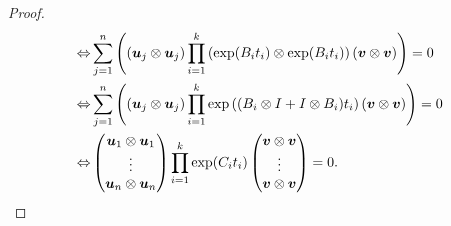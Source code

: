 \begin{proof}
\begin{align*}
\Leftrightarrow &\sum \limits_{j=1}^{n} \left( \left( \boldsymbol{u}_{j} \otimes \boldsymbol{u}_{j} \right) \prod \limits_{i=1}^{k} \left( \exp( B_{i} t_{i} ) \otimes \exp(B_{i} t_{i}) \right) \left( \boldsymbol{v} \otimes \boldsymbol{v} \right) \right) = 0 \\
\Leftrightarrow &\sum \limits_{j=1}^{n} \left( \left( \boldsymbol{u}_{j} \otimes \boldsymbol{u}_{j} \right) \prod \limits_{i=1}^{k} \exp\left((B_{i} \otimes I + I \otimes B_{i}) t_{i} \right) \left( \boldsymbol{v} \otimes \boldsymbol{v} \right) \right) = 0 \\
\Leftrightarrow &\begin{pmatrix} \boldsymbol{u}_{1} \otimes \boldsymbol{u}_{1} \\ \vdots \\ \boldsymbol{u}_{n} \otimes \boldsymbol{u}_{n} \end{pmatrix} \prod \limits_{i=1}^{k} \exp( C_{i} t_{i} ) \begin{pmatrix} \boldsymbol{v} \otimes \boldsymbol{v} \\ \vdots \\ \boldsymbol{v} \otimes \boldsymbol{v} \end{pmatrix} = 0 .
\end{align*}
\end{proof}